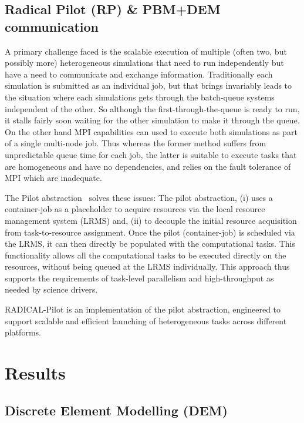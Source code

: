 \documentclass[preprint,11pt,authoryear]{elsarticle}
\begin{document}
\subsection{Radical Pilot (RP) \& PBM+DEM communication}


A primary challenge faced is the scalable execution of multiple (often two,
but possibly more) heterogeneous simulations that need to run independently
but have a need to communicate and exchange information. Traditionally each
simulation is submitted as an individual job, but that brings invariably leads
to the situation where each simulations gets through the batch-queue systems
independent of the other. So although the first-through-the-queue is ready to
run, it stalls fairly soon waiting for the other simulation to make it through
the queue.  On the other hand MPI capabilities can used to  execute both
simulations as part of a single multi-node job.  Thus whereas the former
method suffers from unpredictable queue time for each job, the latter is
suitable to execute tasks that are homogeneous and have no dependencies, and
relies on the fault tolerance of MPI which are inadequate.


The Pilot abstraction~\cite{review_pilotreview} solves these issues:  The
pilot abstraction, (i) uses a container-job as a placeholder to acquire
resources via the local resource management system (LRMS) and,  (ii) to
decouple the initial resource acquisition from task-to-resource assignment.
Once the pilot (container-job) is scheduled via the LRMS, it can then directly
be populated with the computational tasks. This functionality allows all the
computational tasks to be executed directly on the resources, without being
queued at the LRMS individually. This approach thus supports the requirements
of task-level parallelism and high-throughput as needed by science drivers.

RADICAL-Pilot is an implementation of the pilot abstraction, engineered to
support scalable and efficient launching of heterogeneous tasks
across different platforms.



\section{Results}
\label{sec:Results}
\subsection{Discrete Element Modelling (DEM)}
\end{document}
